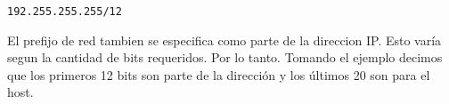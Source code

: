 \begin{center}
\texttt{192.255.255.255/12}
\end{center}

El prefijo de red tambien se especifica como parte de la direccion IP. Esto varía segun la cantidad de bits requeridos. Por lo tanto. Tomando el ejemplo decimos que los primeros 12 bits son parte de la dirección y los últimos 20 son para el host.